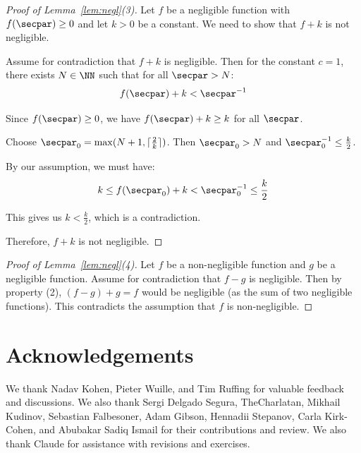 \documentclass[
  a4paper,
  orivec,oribibl]{llncs}
\begin{document}
\begin{proof}[Proof of Lemma~\ref{lem:negl}(3)]
  Let $f$ be a negligible function with $f(\secpar) \ge 0$ and let $k > 0$ be a constant.
  We need to show that $f + k$ is not negligible.
  
  Assume for contradiction that $f + k$ is negligible. 
  Then for the constant $c = 1$, there exists $N \in \NN$ such that for all $\secpar > N$:
  \[
    f(\secpar) + k < \secpar^{-1}
  \]
  
  Since $f(\secpar) \ge 0$, we have $f(\secpar) + k \ge k$ for all $\secpar$.
  
  Choose $\secpar_0 = \max(N + 1, \lceil \frac{2}{k} \rceil)$. Then $\secpar_0 > N$ and $\secpar_0^{-1} \le \frac{k}{2}$.
  
  By our assumption, we must have:
  \[
    k \le f(\secpar_0) + k < \secpar_0^{-1} \le \frac{k}{2}
  \]
  
  This gives us $k < \frac{k}{2}$, which is a contradiction.
  
  Therefore, $f + k$ is not negligible.
\end{proof}

\begin{proof}[Proof of Lemma~\ref{lem:negl}(4)]
  Let $f$ be a non-negligible function and $g$ be a negligible function.
  Assume for contradiction that $f - g$ is negligible.
  Then by property (2), $(f - g) + g = f$ would be negligible (as the sum of two negligible functions).
  This contradicts the assumption that $f$ is non-negligible.
\end{proof}

\section*{Acknowledgements}
We thank Nadav Kohen, Pieter Wuille, and Tim Ruffing for valuable feedback and discussions.
We also thank Sergi Delgado Segura, TheCharlatan, Mikhail Kudinov, Sebastian Falbesoner, Adam Gibson, Hennadii Stepanov, Carla Kirk-Cohen, and Abubakar Sadiq Ismail for their contributions and review.
We also thank Claude for assistance with revisions and exercises.

\iffull
\end{document}
